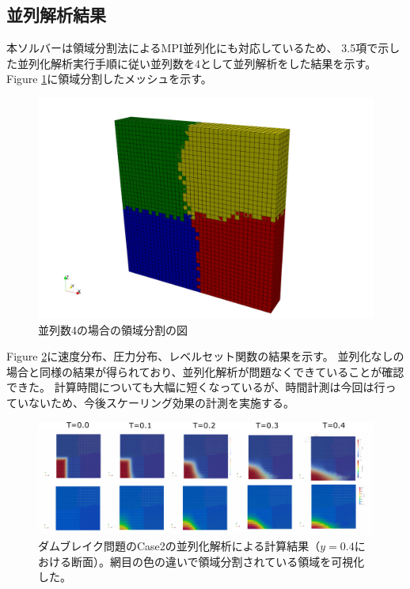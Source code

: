 \documentclass[8pt,a4paper]{article}
\begin{document}
\subsection{並列解析結果}
本ソルバーは領域分割法によるMPI並列化にも対応しているため、
3.5項で示した並列化解析実行手順に従い並列数を4として並列解析をした結果を示す。
Figure \ref{fig:3d-dambreak-parallel-partition}に領域分割したメッシュを示す。

\begin{figure}[H]
	\centering
	\includegraphics[width=18truecm]{pics/3d-dambreak-parallel/partition4.pdf}
	\caption{並列数4の場合の領域分割の図}
	\label{fig:3d-dambreak-parallel-partition}
\end{figure}

Figure \ref{fig:3d-dambreak-parallel-result}に速度分布、圧力分布、レベルセット関数の結果を示す。
並列化なしの場合と同様の結果が得られており、並列化解析が問題なくできていることが確認できた。
計算時間についても大幅に短くなっているが、時間計測は今回は行っていないため、今後スケーリング効果の計測を実施する。

\begin{figure}[H]
	\centering
	\includegraphics[width=18truecm]{pics/3d-dambreak-parallel/result-partition4.pdf}
	\caption{ダムブレイク問題のCase2の並列化解析による計算結果（$y=0.4$における断面）。網目の色の違いで領域分割されている領域を可視化した。}
	\label{fig:3d-dambreak-parallel-result}
\end{figure}
\end{document}
